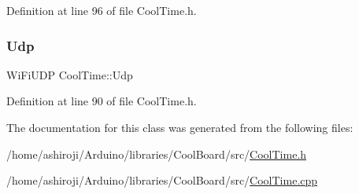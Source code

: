 Definition at line 96 of file Cool\+Time.\+h.

\mbox{\label{class_cool_time_a4e23216a8121ca79d0fb019f30884b92}} 
\subsubsection{\texorpdfstring{Udp}{Udp}}
{\footnotesize\ttfamily Wi\+Fi\+U\+DP Cool\+Time\+::\+Udp\hspace{0.3cm}{\ttfamily [private]}}



Definition at line 90 of file Cool\+Time.\+h.



The documentation for this class was generated from the following files\+:\begin{DoxyCompactItemize}
\item 
/home/ashiroji/\+Arduino/libraries/\+Cool\+Board/src/\hyperlink{_cool_time_8h}{Cool\+Time.\+h}\item 
/home/ashiroji/\+Arduino/libraries/\+Cool\+Board/src/\hyperlink{_cool_time_8cpp}{Cool\+Time.\+cpp}\end{DoxyCompactItemize}
